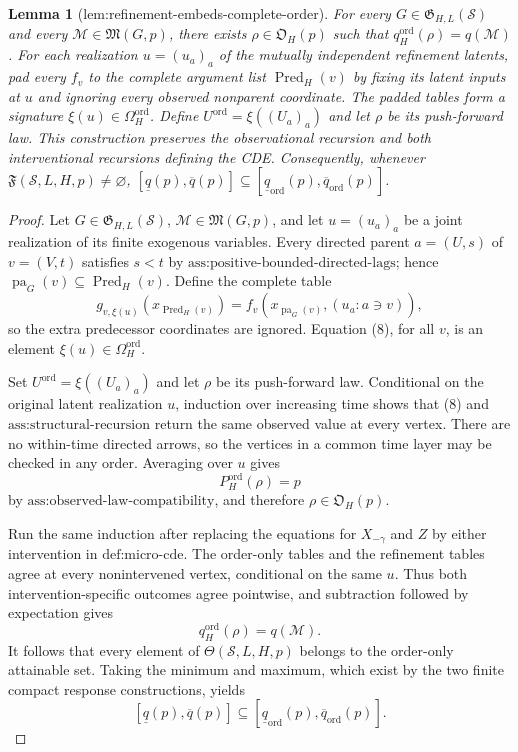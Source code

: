 \documentclass{article}
\newtheorem{lemma}{Lemma}
\begin{document}
\begin{lemma}[lem:refinement-embeds-complete-order]\label{lem:refinement-embeds-complete-order}
For every \(G\in\mathfrak G_{H,L}(\mathcal S)\) and every \(\mathcal M\in\mathfrak M(G,p)\), there exists \(\rho\in\mathfrak O_H(p)\) such that \(q_H^{\mathrm{ord}}(\rho)=q(\mathcal M)\). For each realization \(u=(u_a)_a\) of the mutually independent refinement latents, pad every \(f_v\) to the complete argument list \(\operatorname{Pred}_H(v)\) by fixing its latent inputs at \(u\) and ignoring every observed nonparent coordinate. The padded tables form a signature \(\xi(u)\in\Omega_H^{\mathrm{ord}}\). Define \(U^{\mathrm{ord}}=\xi((U_a)_a)\) and let \(\rho\) be its push-forward law. This construction preserves the observational recursion and both interventional recursions defining the CDE. Consequently, whenever \(\mathfrak F(\mathcal S,L,H,p)\ne\varnothing\), \([\underline q(p),\overline q(p)]\subseteq[\underline q_{\mathrm{ord}}(p),\overline q_{\mathrm{ord}}(p)]\).
\end{lemma}
\begin{proof}
Let \(G\in\mathfrak G_{H,L}(\mathcal S)\), \(\mathcal M\in\mathfrak M(G,p)\), and let \(u=(u_a)_a\) be a joint realization of its finite exogenous variables.  Every directed parent \(a=(U,s)\) of \(v=(V,t)\) satisfies \(s<t\) by \(\text{ass:positive-bounded-directed-lags}\); hence \(\operatorname{pa}_G(v)\subseteq\operatorname{Pred}_H(v)\).  Define the complete table
\[
g_{v,\xi(u)}(x_{\operatorname{Pred}_H(v)})
=f_v(x_{\operatorname{pa}_G(v)},(u_a:a\ni v)),
\tag{8}
\]
so the extra predecessor coordinates are ignored.  Equation (8), for all \(v\), is an element \(\xi(u)\in\Omega_H^{\mathrm{ord}}\).

Set \(U^{\mathrm{ord}}=\xi((U_a)_a)\) and let \(\rho\) be its push-forward law.  Conditional on the original latent realization \(u\), induction over increasing time shows that (8) and \(\text{ass:structural-recursion}\) return the same observed value at every vertex.  There are no within-time directed arrows, so the vertices in a common time layer may be checked in any order.  Averaging over \(u\) gives
\[
P_H^{\mathrm{ord}}(\rho)=p
\]
by \(\text{ass:observed-law-compatibility}\), and therefore \(\rho\in\mathfrak O_H(p)\).

Run the same induction after replacing the equations for \(X_{-\gamma}\) and \(Z\) by either intervention in \(\text{def:micro-cde}\).  The order-only tables and the refinement tables agree at every nonintervened vertex, conditional on the same \(u\).  Thus both intervention-specific outcomes agree pointwise, and subtraction followed by expectation gives
\[
q_H^{\mathrm{ord}}(\rho)=q(\mathcal M).
\tag{9}
\]
It follows that every element of \(\Theta(\mathcal S,L,H,p)\) belongs to the order-only attainable set.  Taking the minimum and maximum, which exist by the two finite compact response constructions, yields
\[
[\underline q(p),\overline q(p)]
\subseteq[\underline q_{\mathrm{ord}}(p),\overline q_{\mathrm{ord}}(p)].
\]
\end{proof}
\end{document}
